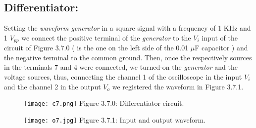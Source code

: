 \subsection{Differentiator:}

Setting the {\itshape waveform generator} in a square signal with a frequency of 1 KHz and 1 $V_{pp}$ we connect the positive terminal of the {\itshape generator} to the $V_{i}$ input of the circuit of Figure 3.7.0 ( is the one on the left side of the 0.01 $\mu$F capacitor ) and the negative terminal to the common ground. Then, once the respectively sources in the terminals 7 and 4 were connected, we turned-on the {\itshape generator} and the voltage sources, thus, connecting the channel 1 of the oscilloscope in the input $V_{i}$ and the channel 2 in the output $V_{o}$ we registered the waveform in Figure 3.7.1. \hfill \break

\begin{multicols}{2}
\begin{figure}[H]
\texttt{[image: c7.png]}
\centering \linebreak \linebreak Figure 3.7.0: Differentiator circuit.
\end{figure}

\begin{figure}[H]
\texttt{[image: o7.jpg]}
\centering \linebreak \linebreak Figure 3.7.1: Input and output waveform.
\end{figure}
\end{multicols} \hfill

{\bfseries\itshape\color{carmine}{Observation:}} {\itshape\color{carmine}{The input waveform is a triangle wave, as an effect of the differentiation the output waveform is a square wave.}}